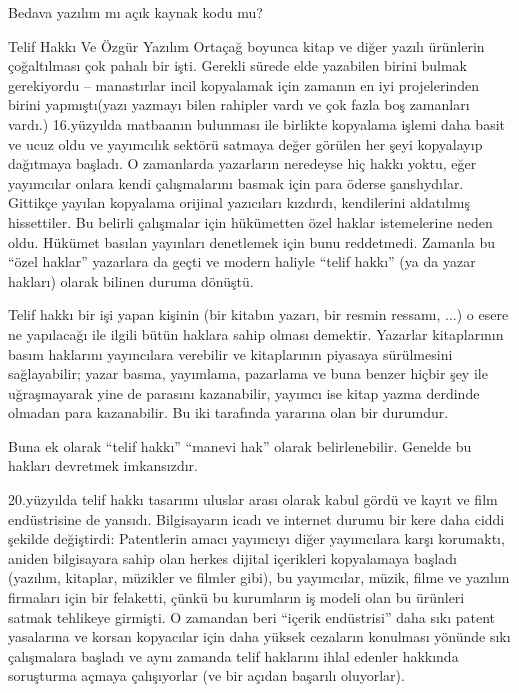 \begin{section}{Bedava yazılım mı açık kaynak kodu mu?}
\begin{subsection}{Telif Hakkı Ve Özgür Yazılım}
Ortaçağ boyunca kitap ve diğer yazılı ürünlerin çoğaltılması çok pahalı bir işti. Gerekli sürede elde yazabilen birini bulmak gerekiyordu -- manastırlar incil kopyalamak için zamanın en iyi projelerinden birini yapmıştı(yazı yazmayı bilen rahipler vardı ve çok fazla boş zamanları vardı.) 16.yüzyılda matbaanın bulunması ile birlikte kopyalama işlemi daha basit ve ucuz oldu ve yayımcılık sektörü satmaya değer görülen her şeyi kopyalayıp dağıtmaya başladı. O zamanlarda yazarların neredeyse hiç hakkı yoktu, eğer yayımcılar onlara kendi çalışmalarını basmak için para öderse şanslıydılar. Gittikçe yayılan kopyalama orijinal yazıcıları kızdırdı, kendilerini aldatılmış hissettiler. Bu belirli çalışmalar için hükümetten özel haklar istemelerine neden oldu. Hükümet basılan yayınları denetlemek için bunu reddetmedi. Zamanla bu “özel haklar” yazarlara da geçti ve modern haliyle “telif hakkı” (ya da yazar hakları) olarak bilinen duruma dönüştü.

Telif hakkı bir işi yapan kişinin (bir kitabın yazarı, bir resmin ressamı, ...) o esere ne yapılacağı ile ilgili bütün haklara sahip olması demektir. Yazarlar kitaplarının basım haklarını yayıncılara verebilir ve kitaplarının piyasaya sürülmesini sağlayabilir; yazar basma, yayımlama, pazarlama ve buna benzer hiçbir şey ile uğraşmayarak yine de parasını kazanabilir, yayımcı ise kitap yazma derdinde olmadan para kazanabilir. Bu iki tarafında yararına olan bir durumdur.

Buna ek olarak “telif hakkı” “manevi hak” olarak belirlenebilir. Genelde bu hakları devretmek imkansızdır.

20.yüzyılda telif hakkı tasarımı uluslar arası olarak kabul gördü ve kayıt ve film endüstrisine de yansıdı. Bilgisayarın icadı ve internet durumu bir kere daha ciddi şekilde değiştirdi: Patentlerin amacı yayımcıyı diğer yayımcılara karşı korumaktı, aniden bilgisayara sahip olan herkes dijital içerikleri kopyalamaya başladı (yazılım, kitaplar, müzikler ve filmler gibi), bu yayımcılar, müzik, filme ve yazılım firmaları için bir felaketti, çünkü bu kurumların iş modeli olan bu ürünleri satmak tehlikeye girmişti. O zamandan beri “içerik endüstrisi” daha sıkı patent yasalarına ve korsan kopyacılar için daha yüksek cezaların konulması yönünde sıkı çalışmalara başladı ve aynı zamanda telif haklarını ihlal edenler hakkında soruşturma açmaya çalışıyorlar (ve bir açıdan başarılı oluyorlar).


\end{subsection}
\end{section}
